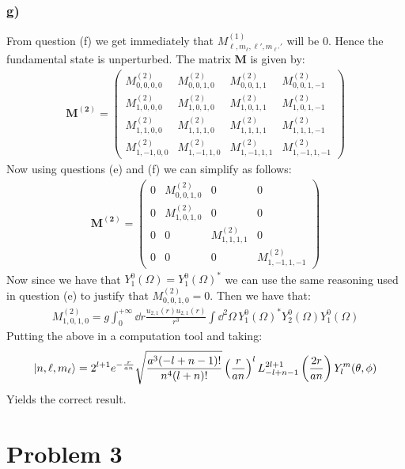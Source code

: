 \documentclass[10pt,a4paper]{book}
\begin{document}
\subsubsection*{g)}
From question (f) we get immediately that $M^{(1)}_{\ell, m_\ell, \ell', m_{\ell'}'}$ will be 0. Hence the fundamental state is unperturbed. The matrix $\mathbf{M}$ is given by:
\begin{align*}
\mathbf{M^{(2)}} = 
\begin{pmatrix}
M^{(2)}_{0, 0, 0, 0} & M^{(2)}_{0, 0, 1, 0} & M^{(2)}_{0, 0, 1, 1} & M^{(2)}_{0, 0, 1, -1}\\
M^{(2)}_{1, 0, 0, 0} & M^{(2)}_{1, 0, 1, 0} & M^{(2)}_{1, 0, 1, 1} & M^{(2)}_{1, 0, 1, -1} \\
M^{(2)}_{1, 1, 0, 0} & M^{(2)}_{1, 1, 1, 0} & M^{(2)}_{1, 1, 1, 1} & M^{(2)}_{1, 1, 1, -1} \\
M^{(2)}_{1, -1, 0, 0} & M^{(2)}_{1, -1, 1, 0} & M^{(2)}_{1, -1, 1, 1} & M^{(2)}_{1, -1, 1, -1}
\end{pmatrix}
\end{align*}
Now using questions (e) and (f) we can simplify as follows:
\begin{align*}
\mathbf{M^{(2)}} = 
\begin{pmatrix}
0 & M^{(2)}_{0, 0, 1, 0} & 0 & 0\\
0 & M^{(2)}_{1, 0, 1, 0} & 0 & 0 \\
0 & 0 & M^{(2)}_{1, 1, 1, 1} & 0 \\
0 & 0 & 0 & M^{(2)}_{1, -1, 1, -1}
\end{pmatrix}
\end{align*}
Now since we have that $Y_{1}^{0}(\Omega) = Y_{1}^0 (\Omega)^*$ we can use the same reasoning used in question (e) to justify that $M^{(2)}_{0,0,1,0} = 0$. Then we have that:
\begin{align*}
M_{1,0,1,0}^{(2)} = g\int_0^{+\infty} \dd r \frac{u_{2, 1}(r) u_{2, 1}(r)}{r^3} \int \dd^2 \Omega \, Y_1^{0} (\Omega)^* Y_2^0 (\Omega) Y_{1}^{0} (\Omega)
\end{align*}
Putting the above in a computation tool and taking:
\[
\ket{n, \ell, m_\ell} = 2^{l+1} e^{-\frac{r}{a n}} \sqrt{\frac{a^3 (-l+n-1)!}{n^4 (l+n)!}} \left(\frac{r}{a
   n}\right)^l L_{-l+n-1}^{2 l+1}\left(\frac{2 r}{a n}\right) Y_l^m(\theta ,\phi )
\]
Yields the correct result.

\section*{Problem 3}
\end{document}
